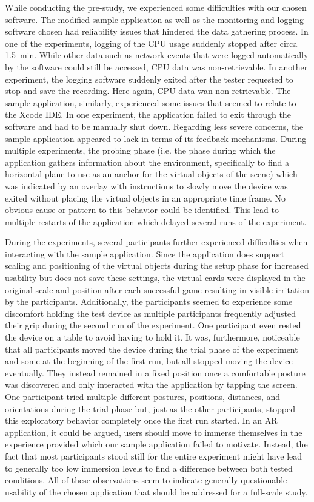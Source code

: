 \documentclass[12pt,twoside,english]{article}
\begin{document}
While conducting the pre-study, we experienced some difficulties with our chosen software.
The modified sample application as well as the monitoring and logging software chosen had reliability issues that hindered the data gathering process.
In one of the experiments, logging of the \gls{CPU} usage suddenly stopped after circa 1.5~min.
While other data such as network events that were logged automatically by the software could still be accessed, \gls{CPU} data was non-retrievable.
In another experiment, the logging software suddenly exited after the tester requested to stop and save the recording.
Here again, \gls{CPU} data wan non-retrievable.
The sample application, similarly, experienced some issues that seemed to relate to the Xcode \gls{IDE}.
In one experiment, the application failed to exit through the software and had to be manually shut down.
Regarding less severe concerns, the sample application appeared to lack in terms of its feedback mechanisms.
During multiple experiments, the probing phase (i.e. the phase during which the application gathers information about the environment, specifically to find a horizontal plane to use as an anchor for the virtual objects of the scene) which was indicated by an overlay with instructions to slowly move the device was exited without placing the virtual objects in an appropriate time frame.
No obvious cause or pattern to this behavior could be identified.
This lead to multiple restarts of the application which delayed several runs of the experiment.

During the experiments, several participants further experienced difficulties when interacting with the sample application.
Since the application does support scaling and positioning of the virtual objects during the setup phase for increased usability but does not save these settings, the virtual cards were displayed in the original scale and position after each successful game resulting in visible irritation by the participants.
Additionally, the participants seemed to experience some discomfort holding the test device as multiple participants frequently adjusted their grip during the second run of the experiment.
One participant even rested the device on a table to avoid having to hold it.
It was, furthermore, noticeable that all participants moved the device during the trial phase of the experiment and some at the beginning of the first run, but all stopped moving the device eventually.
They instead remained in a fixed position once a comfortable posture was discovered and only interacted with the application by tapping the screen.
One participant tried multiple different postures, positions, distances, and orientations during the trial phase but, just as the other participants, stopped this exploratory behavior completely once the first run started.
In an \gls{AR} application, it could be argued, users should move to immerse themselves in the experience provided which our sample application failed to motivate.
Instead, the fact that most participants stood still for the entire experiment might have lead to generally too low immersion levels to find a difference between both tested conditions.
All of these observations seem to indicate generally questionable usability of the chosen application that should be addressed for a full-scale study.
\end{document}
